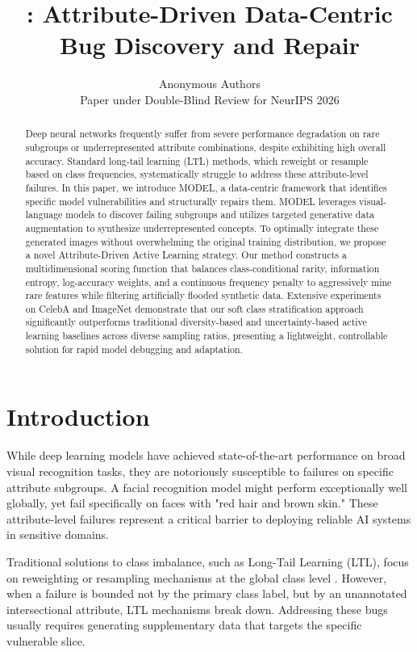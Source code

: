 \documentclass{article}
\title{\model: Attribute-Driven Data-Centric Bug Discovery and Repair}
\author{%
  Anonymous Authors \\
  Paper under Double-Blind Review for NeurIPS 2026 %
}
\newcommand{\model}{MODEL\xspace}
\begin{document}
\maketitle

\begin{abstract}
Deep neural networks frequently suffer from severe performance degradation on rare subgroups or underrepresented attribute combinations, despite exhibiting high overall accuracy. Standard long-tail learning (LTL) methods, which reweight or resample based on class frequencies, systematically struggle to address these attribute-level failures. In this paper, we introduce \model, a data-centric framework that identifies specific model vulnerabilities and structurally repairs them. \model leverages visual-language models to discover failing subgroups and utilizes targeted generative data augmentation to synthesize underrepresented concepts. To optimally integrate these generated images without overwhelming the original training distribution, we propose a novel Attribute-Driven Active Learning strategy. Our method constructs a multidimensional scoring function that balances class-conditional rarity, information entropy, log-accuracy weights, and a continuous frequency penalty to aggressively mine rare features while filtering artificially flooded synthetic data. Extensive experiments on CelebA and ImageNet demonstrate that our soft class stratification approach significantly outperforms traditional diversity-based and uncertainty-based active learning baselines across diverse sampling ratios, presenting a lightweight, controllable solution for rapid model debugging and adaptation.
\end{abstract}

\section{Introduction}

While deep learning models have achieved state-of-the-art performance on broad visual recognition tasks, they are notoriously susceptible to failures on specific attribute subgroups. A facial recognition model might perform exceptionally well globally, yet fail specifically on faces with "red hair and brown skin." These attribute-level failures represent a critical barrier to deploying reliable AI systems in sensitive domains.

Traditional solutions to class imbalance, such as Long-Tail Learning (LTL), focus on reweighting or resampling mechanisms at the global class level \citep{lin2017focal,cao2019learning}. However, when a failure is bounded not by the primary class label, but by an unannotated intersectional attribute, LTL mechanisms break down. Addressing these bugs usually requires generating supplementary data that targets the specific vulnerable slice.
\end{document}
